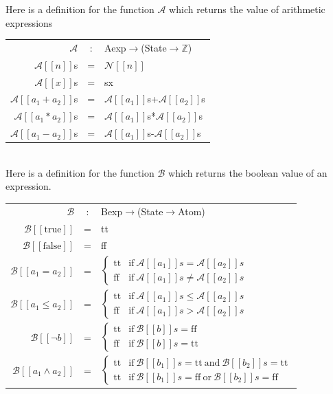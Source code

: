 \documentclass[11pt,a4paper]{article}
\begin{document}
Here is a definition for the function $\mathcal{A}$ which returns the value of arithmetic expressions\\
\begin{tabular}{rcl}
$\mathcal{A}$&:&Aexp$\to$(State$\to\mathbb{Z}$)\\
$\mathcal{A}[[n]]$s&=&$\mathcal{N}[[n]]$\\
$\mathcal{A}[[x]]$s&=&sx\\
$\mathcal{A}[[a_1+a_2]]$s&=&$\mathcal{A}[[a_1]]$s+$\mathcal{A}[[a_2]]$s\\
$\mathcal{A}[[a_1*a_2]]$s&=&$\mathcal{A}[[a_1]]$s*$\mathcal{A}[[a_2]]$s\\
$\mathcal{A}[[a_1-a_2]]$s&=&$\mathcal{A}[[a_1]]$s-$\mathcal{A}[[a_2]]$s
\end{tabular}
\\

Here is a definition for the function $\mathcal{B}$ which returns the boolean value of an expression.\\
\begin{tabular}{rcl}
$\mathcal{B}$&:&Bexp$\to$(State$\to$Atom)\\
$\mathcal{B}[[\mathrm{true}]]$&=&tt\\
$\mathcal{B}[[\mathrm{false}]]$&=&ff\\
$\mathcal{B}[[a_1=a_2]]$&=&$\begin{cases}\mathrm{tt}&\mathrm{if\ }\mathcal{A}[[a_1]]s=\mathcal{A}[[a_2]]s\\\mathrm{ff}&\mathrm{if\ }\mathcal{A}[[a_1]]s\neq\mathcal{A}[[a_2]]s\end{cases}$\\
$\mathcal{B}[[a_1\leq a_2]]$&=&$\begin{cases}\mathrm{tt}&\mathrm{if\ }\mathcal{A}[[a_1]]s\leq\mathcal{A}[[a_2]]s\\\mathrm{ff}&\mathrm{if\ }\mathcal{A}[[a_1]]s>\mathcal{A}[[a_2]]s\end{cases}$\\
$\mathcal{B}[[\neg b]]$&=&$\begin{cases}\mathrm{tt}&\mathrm{if\ }\mathcal{B}[[b]]s=\mathrm{ff}\\\mathrm{ff}&\mathrm{if\ }\mathcal{B}[[b]]s=\mathrm{tt}\end{cases}$\\
$\mathcal{B}[[a_1\wedge a_2]]$&=&$\begin{cases}\mathrm{tt}&\mathrm{if\ }\mathcal{B}[[b_1]]s=\mathrm{tt\ and\ }\mathcal{B}[[b_2]]s=\mathrm{tt}\\\mathrm{tt}&\mathrm{if\ }\mathcal{B}[[b_1]]s=\mathrm{ff\ or\ }\mathcal{B}[[b_2]]s=\mathrm{ff}\end{cases}$\\
\end{tabular}
\\
\end{document}
